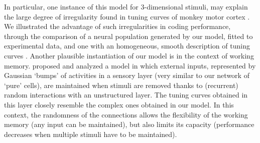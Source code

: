 \documentclass[a4paper]{article}
\begin{document}
In particular, one instance of this model for 3-dimensional stimuli, may explain the large degree of irregularity found in tuning curves of monkey motor cortex \cite[]{Lalazar2016TuningConnectivity}. We illustrated the advantage of such irregularities in coding performance,  through the comparison of a neural population generated by our model, fitted to experimental data, and one with an homogeneous, smooth description of tuning curves \cite[]{Wang2007MotorReaching}.  
Another plausible instantiation of our model is in the context of working memory.  \cite{Bouchacourt2019AMemory} proposed and analyzed a model in which external inputs, represented by Gaussian `bumps' of activities in a sensory layer (very similar to our network of `pure' cells), are maintained when stimuli are removed thanks to (recurrent) random interactions with an unstructured layer. The tuning curves obtained in this layer closely resemble the complex ones obtained in our model. In this context, the randomness of the connections allows the flexibility of the working memory  (any input can be maintained), but also limits its capacity (performance decreases when multiple stimuli have to be maintained).
\end{document}
